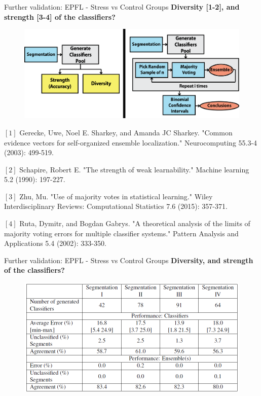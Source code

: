 \documentclass{beamer}
\newcounter{mycounter}
\newenvironment{noindlist}
{\begin{list}{}{\usecounter{mycounter} \labelsep=0em \labelwidth=0em \leftmargin=0em \itemindent=0em}}
	{\end{list}}
\begin{document}
{\begin{frame}{Further validation: EPFL - Stress vs Control Groups}
	\textbf{Diversity [1-2], and strength [3-4] of the classifiers?}\\ 
	\vspace{2mm}	
	\begin{figure}[H]
		\centering
		\includegraphics[width=\textwidth]{figures/testing1}
	\end{figure}
	\vspace{1mm}
	\begin{tiny}
		\begin{noindlist}
			\item $[1]$ Gerecke, Uwe, Noel E. Sharkey, and Amanda JC Sharkey. "Common evidence vectors for self-organized ensemble localization." Neurocomputing 55.3-4 (2003): 499-519.
			\item $[2]$ Schapire, Robert E. "The strength of weak learnability." Machine learning 5.2 (1990): 197-227.
			\item $[3]$ Zhu, Mu. "Use of majority votes in statistical learning." Wiley Interdisciplinary Reviews: Computational Statistics 7.6 (2015): 357-371.
			\item $[4]$ Ruta, Dymitr, and Bogdan Gabrys. "A theoretical analysis of the limits of majority voting errors for multiple classifier systems." Pattern Analysis and Applications 5.4 (2002): 333-350.
		\end{noindlist}
	\end{tiny}
\end{frame}
\begin{frame}{Further validation: EPFL - Stress vs Control Groups}
	\textbf{Diversity, and strength of the classifiers?}\\ 
	\vspace{3mm}	
	\begin{figure}[H]
		\centering
		\includegraphics[width=\textwidth]{figures/testing2}
	\end{figure}
	\vspace{15mm}
\end{frame}

}
\end{document}

